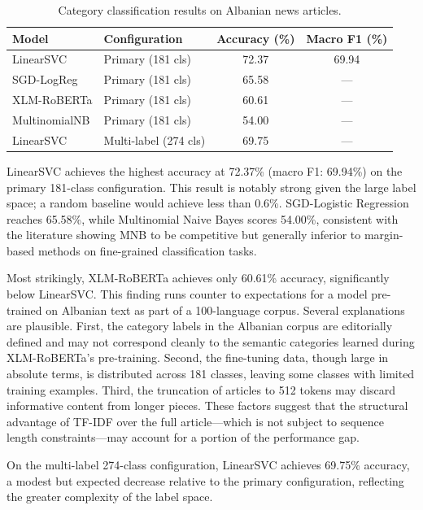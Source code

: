 \documentclass[12pt,a4paper]{article}
\begin{document}
\begin{table}[H]
    \centering
    \caption{Category classification results on Albanian news articles.}
    \label{tab:category}
    \begin{tabular}{llcc}
        \toprule
        \textbf{Model} & \textbf{Configuration} & \textbf{Accuracy (\%)} & \textbf{Macro F1 (\%)} \\
        \midrule
        LinearSVC       & Primary (181 cls)      & 72.37 & 69.94 \\
        SGD-LogReg      & Primary (181 cls)      & 65.58 & ---   \\
        XLM-RoBERTa     & Primary (181 cls)      & 60.61 & ---   \\
        MultinomialNB   & Primary (181 cls)      & 54.00 & ---   \\
        LinearSVC       & Multi-label (274 cls)  & 69.75 & ---   \\
        \bottomrule
    \end{tabular}
\end{table}

LinearSVC achieves the highest accuracy at 72.37\% (macro F1: 69.94\%) on the primary 181-class configuration. This result is notably strong given the large label space; a random baseline would achieve less than 0.6\%. SGD-Logistic Regression reaches 65.58\%, while Multinomial Naive Bayes scores 54.00\%, consistent with the literature showing MNB to be competitive but generally inferior to margin-based methods on fine-grained classification tasks.

Most strikingly, XLM-RoBERTa achieves only 60.61\% accuracy, significantly below LinearSVC. This finding runs counter to expectations for a model pre-trained on Albanian text as part of a 100-language corpus. Several explanations are plausible. First, the category labels in the Albanian corpus are editorially defined and may not correspond cleanly to the semantic categories learned during XLM-RoBERTa's pre-training. Second, the fine-tuning data, though large in absolute terms, is distributed across 181 classes, leaving some classes with limited training examples. Third, the truncation of articles to 512 tokens may discard informative content from longer pieces. These factors suggest that the structural advantage of TF-IDF over the full article---which is not subject to sequence length constraints---may account for a portion of the performance gap.

On the multi-label 274-class configuration, LinearSVC achieves 69.75\% accuracy, a modest but expected decrease relative to the primary configuration, reflecting the greater complexity of the label space.
\end{document}
